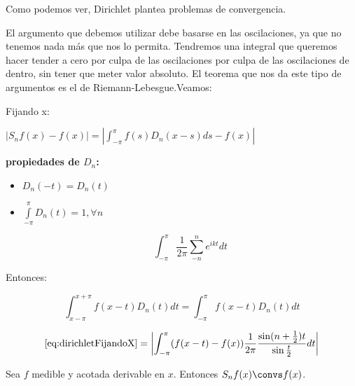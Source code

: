 	Como podemos ver, Dirichlet plantea problemas de convergencia.

	El argumento que debemos utilizar debe basarse en las oscilaciones, ya que no tenemos nada más que nos lo permita. Tendremos una integral que queremos hacer tender a cero por culpa de las oscilaciones por culpa de las oscilaciones de dentro, sin tener que meter valor absoluto. El teorema que nos da este tipo de argumentos es el de Riemann-Lebesgue.Veamos:

	Fijando x:

	\( |S_n f(x) - f(x) | = \left| \int_{-\pi}^\pi f(s) D_n (x-s) ds - f(x) \right| \label{eq:dirichletFijandoX} \)

	\textbf{propiedades de $D_n$:}

	\begin{itemize}
		\item $D_n(-t) = D_n(t)$

		\item $\int\limits_{-\pi}^{\pi} D_n(t) = 1, \forall n $

		\[ \int_{-\pi}^\pi  \frac{1}{2\pi} \sum_{-n}^{n} e^{ikt} dt \]

	\end{itemize}


	Entonces:

	\[  \int_{x-\pi}^{x +\pi} f(x-t) D_n(t) dt = \int^{\pi}_{-\pi} f(x-t) D_n(t) dt \]

	\[ \eqref{eq:dirichletFijandoX} = \left| \int_{-\pi}^\pi (f(x-t)-f(x)) \frac{1}{2\pi} \frac{\sin(n+\frac{1}{2})t}{\sin{\frac{t}{2}}} dt \right| \]


	\begin{theorem}[Dirichlet 1]

		Sea $f$ medible y acotada derivable en $x$. Entonces $S_n f(x) \convs f(x)$.

	\end{theorem}


